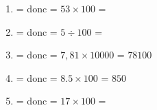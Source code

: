 \begin{methode*1}
\begin{enumerate}
    \item {} =  donc  = $53 \times 100$ \Aire[m]{} = 
    \item {}  =  donc  = $5 \div 100$ \Aire[m]{} = 
    \item {}  =  donc  = $7,81 \times \num{10000}$ \Aire[m]{} = $\num{78100}$ \Aire[m]{}
    \item {}   =  donc  = $\num{8.5} \times 100$ \Aire[m]{} = $850$ \Aire[m]{}
    \item {}  =  donc  = $17 \times 100$ \Aire[a]{} = 
\end{enumerate}

\end{methode*1}